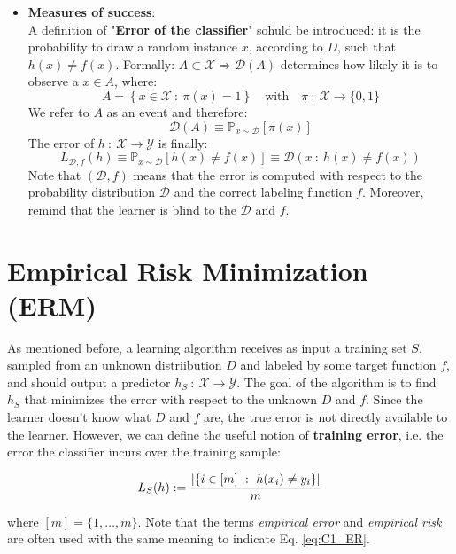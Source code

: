 \documentclass[../../main/main.tex]{subfiles}
\begin{document}
\begin{itemize}
    \item \textbf{Measures of success}:\\
        A definition of "\textbf{Error of the classifier}" sohuld be introduced: it is the probability to draw a random instance \( x \), according to \( D \), such that \( h(x) \neq f(x) \). Formally: \( A \subset \mathcal{X} \Longrightarrow \mathcal{D}(A) \) determines how likely it is to observe a \( x \in A \), where:
        \[
            A = \left\{ x \in \mathcal{X} \ : \ \pi(x) = 1 \right\} \quad
            \text{with} \quad
            \pi \ : \ \mathcal{X} \to \{0,1\}
        \]
        We refer to \( A \) as an event and therefore:
        \[
            \mathcal{D}(A) \equiv \mathbb{P}_{x \sim \mathcal{D}}[\pi(x)]
        \]
        The error of \( h \ : \ \mathcal{X} \to \mathcal{Y} \) is finally:
        \[
            L_{\mathcal{D},f}(h)
            \equiv
            \mathbb{P}_{x \sim \mathcal{D}}[h(x) \neq f(x)]
            \equiv
            \mathcal{D}({x \ : \ h(x) \neq f(x)})
        \]
        Note that \( (\mathcal{D},f) \) means that the error is computed with respect to the probability distribution \( \mathcal{D} \) and the correct labeling function \( f \). Moreover, remind that the learner is blind to the \( \mathcal{D} \) and \( f \).
\end{itemize}





\section{Empirical Risk Minimization (ERM)}
As mentioned before, a learning algorithm receives as input a training set \( S \), sampled from an unknown distriibution \( D \) and labeled by some target function \( f \), and should output a predictor \( h_S \ : \ \mathcal{X} \to \mathcal{Y} \). The goal of the algorithm is to find \( h_S \) that minimizes the error with respect to the unknown \( D \) and \( f \). Since the learner doesn't know what \( D \) and \( f \) are, the true error is not directly available to the learner. However, we can define the useful notion of \textbf{training error}, i.e. the error the classifier incurs over the training sample:

\begin{equation}
    L_S(h) := \frac{\abs{\{i \in [m] \ : \ h(x_i) \neq y_i\}}}{m}
    \label{eq:C1_ER}
\end{equation}

where \( [m] = \{ 1,\dots,m \} \). Note that the terms \emph{empirical error} and \emph{empirical risk} are often used with the same meaning to indicate Eq. \ref{eq:C1_ER}.
\end{document}
